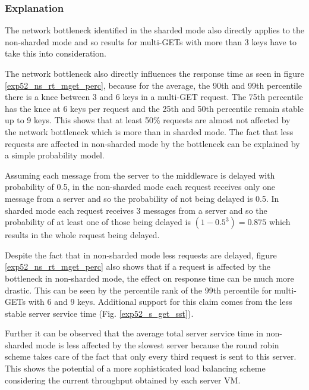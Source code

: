 \documentclass[report.tex]{subfiles}
\begin{document}
\subsubsection{Explanation}

The network bottleneck identified in the sharded mode also directly applies to the non-sharded mode and so results for multi-GETs with more than 3 keys have to take this into consideration.
 
The network bottleneck also directly influences the response time as seen in figure \ref{exp52_ns_rt_mget_perc}, because for the average, the 90th and 99th percentile there is a knee between 3 and 6 keys in a multi-GET request. The 75th percentile has the knee at 6 keys per request and the 25th and 50th percentile remain stable up to 9 keys. This shows that at least 50\% requests are almost not affected by the network bottleneck which is more than in sharded mode. The fact that less requests are affected in non-sharded mode by the bottleneck can be explained by a simple probability model.

Assuming each message from the server to the middleware is delayed with probability of 0.5, in the non-sharded mode each request receives only one message from a server and so the probability of not being delayed is 0.5. In sharded mode each request receives 3 messages from a server and so the probability of at least one of those being delayed is $(1-0.5^3)=0.875$ which results in the whole request being delayed.

Despite the fact that in non-sharded mode less requests are delayed, figure \ref{exp52_ns_rt_mget_perc} also shows that if a request is affected by the bottleneck in non-sharded mode, the effect on response time can be much more drastic. This can be seen by the percentile rank of the 99th percentile for multi-GETs with 6 and 9 keys. Additional support for this claim comes from the less stable server service time (Fig. \ref{exp52_s_get_sst}).

Further it can be observed that the average total server service time in non-sharded mode is less affected by the slowest server because the round robin scheme takes care of the fact that only every third request is sent to this server. This shows the potential of a more sophisticated load balancing scheme considering the current throughput obtained by each server VM.
\end{document}
